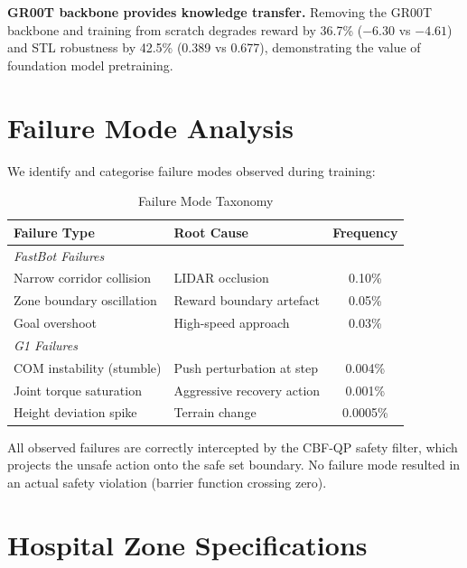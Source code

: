 \documentclass[conference]{IEEEtran}
\begin{document}
\textbf{GR00T backbone provides knowledge transfer.} Removing the GR00T backbone and training from scratch degrades reward by 36.7\% ($-6.30$ vs $-4.61$) and STL robustness by 42.5\% (0.389 vs 0.677), demonstrating the value of foundation model pretraining.

\section{Failure Mode Analysis}
\label{sec:supp_failure}

We identify and categorise failure modes observed during training:

\begin{table}[h]
\centering
\caption{Failure Mode Taxonomy}
\begin{tabular}{@{}llc@{}}
\toprule
\textbf{Failure Type} & \textbf{Root Cause} & \textbf{Frequency} \\
\midrule
\multicolumn{3}{l}{\textit{FastBot Failures}} \\
Narrow corridor collision & LIDAR occlusion & 0.10\% \\
Zone boundary oscillation & Reward boundary artefact & 0.05\% \\
Goal overshoot & High-speed approach & 0.03\% \\
\midrule
\multicolumn{3}{l}{\textit{G1 Failures}} \\
COM instability (stumble) & Push perturbation at step & 0.004\% \\
Joint torque saturation & Aggressive recovery action & 0.001\% \\
Height deviation spike & Terrain change & 0.0005\% \\
\bottomrule
\end{tabular}
\end{table}

All observed failures are correctly intercepted by the CBF-QP safety filter, which projects the unsafe action onto the safe set boundary. No failure mode resulted in an actual safety violation (barrier function crossing zero).

\section{Hospital Zone Specifications}
\label{sec:supp_zones}
\end{document}

